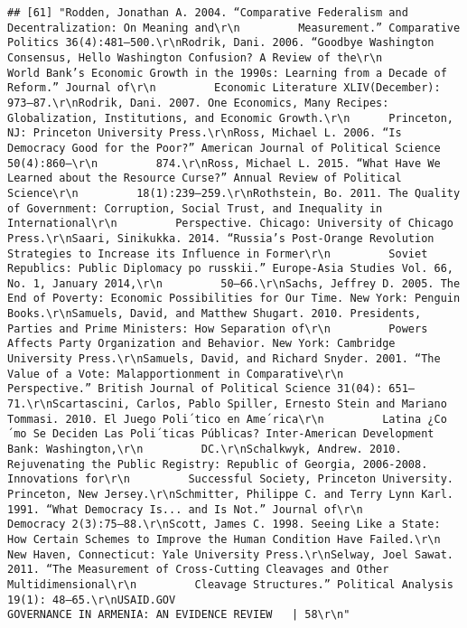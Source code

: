 \documentclass[
]{article}
\begin{document}
\begin{verbatim}
## [61] "Rodden, Jonathan A. 2004. “Comparative Federalism and Decentralization: On Meaning and\r\n         Measurement.” Comparative Politics 36(4):481–500.\r\nRodrik, Dani. 2006. “Goodbye Washington Consensus, Hello Washington Confusion? A Review of the\r\n         World Bank’s Economic Growth in the 1990s: Learning from a Decade of Reform.” Journal of\r\n         Economic Literature XLIV(December): 973–87.\r\nRodrik, Dani. 2007. One Economics, Many Recipes: Globalization, Institutions, and Economic Growth.\r\n      Princeton, NJ: Princeton University Press.\r\nRoss, Michael L. 2006. “Is Democracy Good for the Poor?” American Journal of Political Science 50(4):860–\r\n         874.\r\nRoss, Michael L. 2015. “What Have We Learned about the Resource Curse?” Annual Review of Political Science\r\n         18(1):239–259.\r\nRothstein, Bo. 2011. The Quality of Government: Corruption, Social Trust, and Inequality in International\r\n         Perspective. Chicago: University of Chicago Press.\r\nSaari, Sinikukka. 2014. “Russia’s Post-Orange Revolution Strategies to Increase its Influence in Former\r\n         Soviet Republics: Public Diplomacy po russkii.” Europe-Asia Studies Vol. 66, No. 1, January 2014,\r\n         50–66.\r\nSachs, Jeffrey D. 2005. The End of Poverty: Economic Possibilities for Our Time. New York: Penguin Books.\r\nSamuels, David, and Matthew Shugart. 2010. Presidents, Parties and Prime Ministers: How Separation of\r\n         Powers Affects Party Organization and Behavior. New York: Cambridge University Press.\r\nSamuels, David, and Richard Snyder. 2001. “The Value of a Vote: Malapportionment in Comparative\r\n         Perspective.” British Journal of Political Science 31(04): 651–71.\r\nScartascini, Carlos, Pablo Spiller, Ernesto Stein and Mariano Tommasi. 2010. El Juego Poli´tico en Ame´rica\r\n         Latina ¿Co´mo Se Deciden Las Poli´ticas Públicas? Inter-American Development Bank: Washington,\r\n         DC.\r\nSchalkwyk, Andrew. 2010. Rejuvenating the Public Registry: Republic of Georgia, 2006-2008. Innovations for\r\n         Successful Society, Princeton University. Princeton, New Jersey.\r\nSchmitter, Philippe C. and Terry Lynn Karl. 1991. “What Democracy Is... and Is Not.” Journal of\r\n         Democracy 2(3):75–88.\r\nScott, James C. 1998. Seeing Like a State: How Certain Schemes to Improve the Human Condition Have Failed.\r\n      New Haven, Connecticut: Yale University Press.\r\nSelway, Joel Sawat. 2011. “The Measurement of Cross-Cutting Cleavages and Other Multidimensional\r\n         Cleavage Structures.” Political Analysis 19(1): 48–65.\r\nUSAID.GOV                                                     GOVERNANCE IN ARMENIA: AN EVIDENCE REVIEW   | 58\r\n"                                                                                                                                                                                                                                                                                                                                                                                                                                                                                                                                                                                                          
\end{verbatim}
\end{document}
